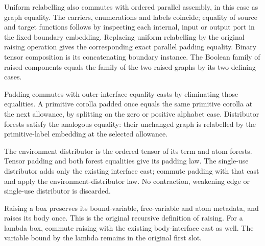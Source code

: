 

Uniform relabelling also commutes with ordered parallel assembly, in this
case as graph equality. The carriers, enumerations and labels coincide;
equality of source and target functions follows by inspecting each internal,
input or output port in the fixed boundary embedding. Replacing uniform
relabelling by the original raising operation gives the corresponding exact
parallel padding equality. Binary tensor composition is its concatenating
boundary instance. The Boolean family of raised components equals the family
of the two raised graphs by its two defining cases.





Padding commutes with outer-interface equality casts by eliminating those
equalities. A primitive corolla padded once equals the same primitive corolla
at the next allowance, by splitting on the zero or positive alphabet case.
Distributor forests satisfy the analogous equality: their unchanged graph
is relabelled by the primitive-label embedding at the selected allowance.

The environment distributor is the ordered tensor of its term and atom
forests. Tensor padding and both forest equalities give its padding law.
The single-use distributor adds only the existing interface cast; commute
padding with that cast and apply the environment-distributor law. No
contraction, weakening edge or single-use distributor is discarded.







Raising a box preserves its bound-variable, free-variable and atom metadata,
and raises its body once. This is the original recursive definition of
raising. For a lambda box, commute raising with the existing body-interface
cast as well. The variable bound by the lambda remains in the original first
slot.

